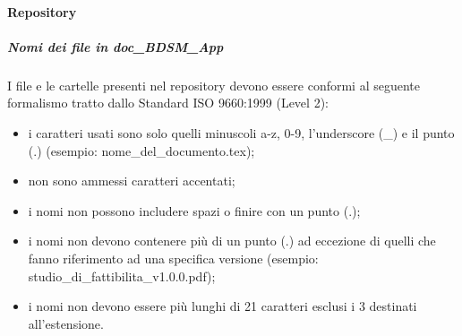 			\paragraph{Repository}
				\subparagraph{Nomi dei file in doc\_BDSM\_App}
				I file e le cartelle presenti nel repository\gloss{} devono essere conformi al seguente formalismo tratto dallo Standard ISO\gloss{} 9660:1999 (Level 2):
					\begin{itemize}
						\item i caratteri usati sono solo quelli minuscoli a-z, 0-9, l'underscore (\_) e il punto (.) (esempio: nome\_del\_documento.tex);
						\item non sono ammessi caratteri accentati;
						\item i nomi non possono includere spazi o finire con un punto (.);
						\item i nomi non devono contenere più di un punto (.) ad eccezione di quelli che fanno riferimento ad una specifica versione (esempio: studio\_di\_fattibilita\_v1.0.0.pdf);
						\item i nomi non devono essere più lunghi di 21 caratteri esclusi i 3 destinati all'estensione.
					\end{itemize}

